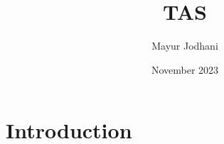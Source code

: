 \documentclass{article}
\title{TAS}
\author{Mayur Jodhani}
\date{November 2023}
\begin{document}
\maketitle

\section{Introduction}
\end{document}

